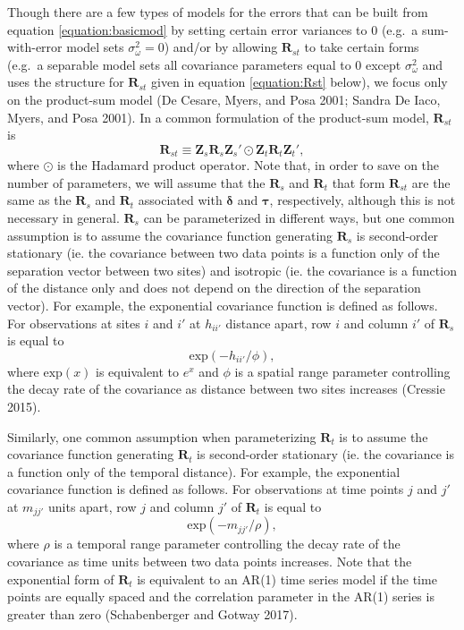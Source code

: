 \documentclass[smallextended]{svjour3}       %
\begin{document}
Though there are a few types of models for the errors that can be built
from equation \ref{equation:basicmod} by setting certain error variances
to 0 (e.g.~a sum-with-error model sets \(\sigma^2_{\omega} = 0\)) and/or
by allowing \(\mathbf{R}_{st}\) to take certain forms (e.g.~a separable
model sets all covariance parameters equal to \(0\) except
\(\sigma^2_{\omega}\) and uses the structure for \(\mathbf{R}_{st}\)
given in equation \ref{equation:Rst} below), we focus only on the
product-sum model (De Cesare, Myers, and Posa 2001; Sandra De Iaco,
Myers, and Posa 2001). In a common formulation of the product-sum model,
\(\mathbf{R}_{st}\) is \mbox{} \begin{equation}
\label{equation:Rst}
\mathbf{R}_{st} \equiv \mathbf{Z}_{s} \mathbf{R}_{s} \mathbf{Z}_{s}' \odot \mathbf{Z}_t \mathbf{R}_t \mathbf{Z}_t',
\end{equation} \noindent where \(\odot\) is the Hadamard product
operator. Note that, in order to save on the number of parameters, we
will assume that the \(\mathbf{R}_s\) and \(\mathbf{R}_t\) that form
\(\mathbf{R}_{st}\) are the same as the \(\mathbf{R}_s\) and
\(\mathbf{R}_t\) associated with \(\bm{\delta}\) and \(\bm{\tau}\),
respectively, although this is not necessary in general.
\(\mathbf{R}_s\) can be parameterized in different ways, but one common
assumption is to assume the covariance function generating
\(\mathbf{R}_s\) is second-order stationary (ie. the covariance between
two data points is a function only of the separation vector between two
sites) and isotropic (ie. the covariance is a function of the distance
only and does not depend on the direction of the separation vector). For
example, the exponential covariance function is defined as follows. For
observations at sites \(i\) and \(i'\) at \(h_{ii'}\) distance apart,
row \(i\) and column \(i'\) of \(\mathbf{R}_{s}\) is equal to \mbox{}
\begin{equation}
\label{equation:spatcov}
\text{exp}(-h_{ii'} / \phi),
\end{equation} \noindent where \(\text{exp}(x)\) is equivalent to
\(e^x\) and \(\phi\) is a spatial range parameter controlling the decay
rate of the covariance as distance between two sites increases (Cressie
2015).

Similarly, one common assumption when parameterizing \(\mathbf{R}_t\) is
to assume the covariance function generating \(\mathbf{R}_t\) is
second-order stationary (ie. the covariance is a function only of the
temporal distance). For example, the exponential covariance function is
defined as follows. For observations at time points \(j\) and \(j'\) at
\(m_{jj'}\) units apart, row \(j\) and column \(j'\) of
\(\mathbf{R}_{t}\) is equal to \mbox{} \begin{equation}
\label{equation:tempcov}
\text{exp}(-m_{jj'} / \rho),
\end{equation} \noindent where \(\rho\) is a temporal range parameter
controlling the decay rate of the covariance as time units between two
data points increases. Note that the exponential form of
\(\mathbf{R}_t\) is equivalent to an AR(1) time series model if the time
points are equally spaced and the correlation parameter in the AR(1)
series is greater than zero (Schabenberger and Gotway 2017).
\end{document}
